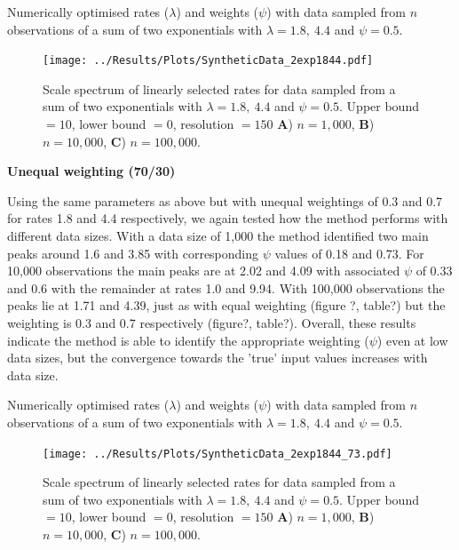 \documentclass[11pt,usenames,dvipsnames]{article}
\begin{document}
\begin{table}[H]
	\centering
	\caption{Numerically optimised rates ($\lambda$) and weights ($\psi$) with data sampled from $n$ observations of a sum of two exponentials with $\lambda = 1.8,\ 4.4$ and $\psi = 0.5$.}
	
\end{table}


\begin{figure}[H]
	\centering
	\texttt{[image: ../Results/Plots/SyntheticData\_2exp1844.pdf]}
	\caption{Scale spectrum of linearly selected rates for data sampled from a sum of two exponentials with $\lambda = 1.8,\ 4.4$ and $\psi = 0.5$. Upper bound $= 10$, lower bound $= 0$, resolution $= 150$ \textbf{A}) $n = 1,000$, \textbf{B}) $n = 10,000$,  \textbf{C}) $n = 100,000$.}
\end{figure}

\noindent
\textbf{Unequal weighting (70/30)}

Using the same parameters as above but with unequal weightings of 0.3 and 0.7 for rates 1.8 and 4.4 respectively, we again tested how the method performs with different data sizes. With a data size of 1,000 the method identified two main peaks around 1.6 and 3.85 with corresponding $\psi$ values of 0.18 and 0.73. For 10,000 observations the main peaks are at 2.02 and 4.09 with associated $\psi$ of 0.33 and 0.6 with the remainder at rates 1.0 and 9.94. With 100,000 observations the peaks lie at 1.71 and 4.39, just as with equal weighting (figure ?, table?) but the weighting is 0.3 and 0.7 respectively (figure?, table?). Overall, these results indicate the method is able to identify the appropriate weighting ($\psi$) even at low data sizes, but the convergence towards the 'true' input values increases with data size.

\begin{table}[H]
	\centering
	\caption{Numerically optimised rates ($\lambda$) and weights ($\psi$) with data sampled from $n$ observations of a sum of two exponentials with $\lambda = 1.8,\ 4.4$ and $\psi = 0.5$.}
	
\end{table}


\begin{figure}[H]
	\centering
	\texttt{[image: ../Results/Plots/SyntheticData\_2exp1844\_73.pdf]}
	\caption{Scale spectrum of linearly selected rates for data sampled from a sum of two exponentials with $\lambda = 1.8,\ 4.4$ and $\psi = 0.5$. Upper bound $= 10$, lower bound $= 0$, resolution $= 150$ \textbf{A}) $n = 1,000$, \textbf{B}) $n = 10,000$,  \textbf{C}) $n = 100,000$.}
\end{figure}
\end{document}
